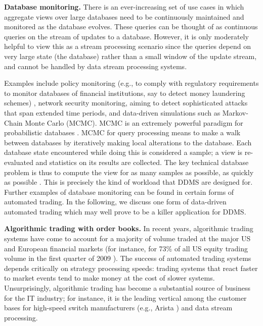 \medskip


{\bf Database monitoring.}\/
There is an ever-increasing set of use cases in which aggregate views
over large databases need to be continuously maintained and monitored as
the database evolves. These queries can be thought of as continuous queries
on the stream of updates to a database. However, it is only moderately
helpful to view this as a stream processing scenario since the queries
depend on very large state (the database) rather than a small window of the
update stream, and cannot be handled by data stream processing systems.

Examples include policy monitoring (e.g., to comply with regulatory requirements to monitor databases of financial institutions,
say to detect money laundering schemes) \cite{BKM2010},
network security monitoring, aiming to detect sophisticated attacks
that span extended time periods, and data-driven simulations such as
Markov-Chain Monte Carlo (MCMC). MCMC is an extremely
powerful paradigm for probabilistic databases \cite{DKM2010}.
MCMC for query processing means to make a walk between databases
by iteratively making local alterations to the database.
Each database state encountered while doing this is considered a sample;
a view is re-evaluated and statistics on its results are collected.
The key technical database
problem is thus to compute the view for as many samples as
possible, as quickly as possible \cite{WMM2010}. This is precisely
the kind of workload that DDMS are designed for.
%
Further examples of database monitoring can be found in
certain forms of automated trading.
In the following, we discuss one form of data-driven automated trading which may well prove to
be a killer application for DDMS.


\medskip


{\bf Algorithmic trading with order books.}\/
In recent years, algorithmic trading systems have come to account for a majority
of volume traded at the major US and European financial markets (for instance,
for 73\% of all US equity trading volume in the first quarter of 2009
\cite{Iati2009}). The success of automated trading systems depends critically on
strategy processing speeds: trading systems that react faster to market events
tend to make money at the cost of slower systems. Unsurprisingly, algorithmic
trading has become a substantial source of business for the IT industry; for
instance, it is the leading vertical among the customer bases for high-speed
switch manufacturers (e.g., Arista \cite{Becht2010}) and data stream processing.




